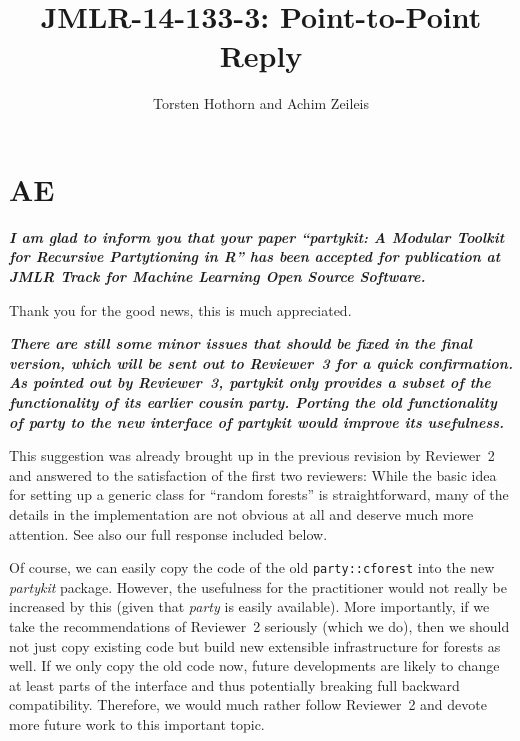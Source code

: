\documentclass{article}
\title{JMLR-14-133-3: Point-to-Point Reply}
\author{Torsten Hothorn and Achim Zeileis}
\begin{document}
\maketitle

\section*{AE}

\textbf{\textit{%
I am glad to inform you that your paper ``partykit: A Modular Toolkit for
Recursive Partytioning in R'' has been accepted for publication at JMLR Track for Machine Learning
Open Source Software.
}}

\smallskip

Thank you for the good news, this is much appreciated.

\smallskip

\textbf{\textit{%
There are still some minor issues that should be fixed in the final version, which will
be sent out to Reviewer~3 for a quick confirmation.
As pointed out by Reviewer~3, partykit only provides a subset of the functionality of its
earlier cousin party. Porting the old functionality of party to the new
interface of partykit would improve its usefulness.}}

\smallskip

This suggestion was already brought up in the previous revision by Reviewer~2
and answered to the satisfaction of the first two reviewers: While the basic idea for
setting up a generic class for ``random forests'' is straightforward, many of the
details in the implementation are not obvious at all and deserve much more attention.
See also our full response included below.

Of course, we can easily copy the code of the old \texttt{party::cforest} into the
new \emph{partykit} package. However, the usefulness for the practitioner would not
really be increased by this (given that \emph{party} is easily available). More
importantly, if we take the recommendations of Reviewer~2 seriously (which we do),
then we should not just copy existing code but build new extensible infrastructure
for forests as well. If we only copy the old code now, future developments are likely
to change at least parts of the interface and thus potentially breaking full
backward compatibility. Therefore, we would much rather follow Reviewer~2 and devote
more future work to this important topic.
\end{document}
